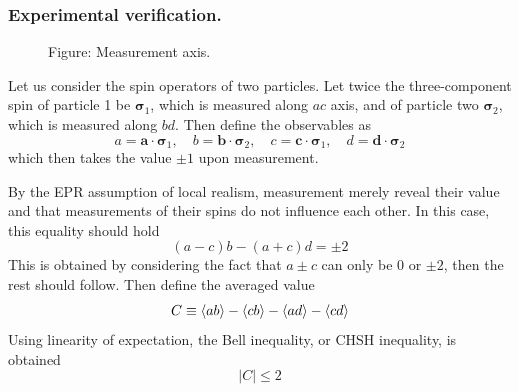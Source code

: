 \documentclass[../../../main.tex]{subfiles}
\begin{document}
\subsubsection{Experimental verification.}

\begin{figure}
  \centering
  \caption*{Figure: Measurement axis.}
\end{figure}

Let us consider the spin operators of two particles.
Let twice the three-component spin of particle 1 be  $\boldsymbol{\sigma}_1$, which is measured along $ac$ axis, and of particle two $\boldsymbol{\sigma}_2$, which is measured along $bd$.
Then define the observables as
\begin{equation*}
  a = \mathbf{a}\cdot\boldsymbol{\sigma}_{1},
  \quad b = \mathbf{b} \cdot\boldsymbol{\sigma}_{2},
  \quad c = \mathbf{c}\cdot\boldsymbol{\sigma}_{1},
  \quad d = \mathbf{d}\cdot\boldsymbol{\sigma}_{2}
\end{equation*}
which then takes the value $\pm 1$ upon measurement.

By the EPR assumption of local realism, measurement merely reveal their value and that measurements of their spins do not influence each other.
In this case, this equality should hold
\begin{equation*}
  (a - c)b - (a + c)d = \pm 2
\end{equation*}
This is obtained by considering the fact that $a\pm c$ can only be $0$ or $\pm 2$, then the rest should follow.
Then define the averaged value
\begin{equation*}
  C \equiv \braket{ab } - \braket{cb} - \braket{ad } -\braket{cd}
\end{equation*}
Using linearity  of expectation, the Bell inequality, or CHSH inequality, is obtained
\begin{equation*}
  | C | \le 2
\end{equation*}
\end{document}
